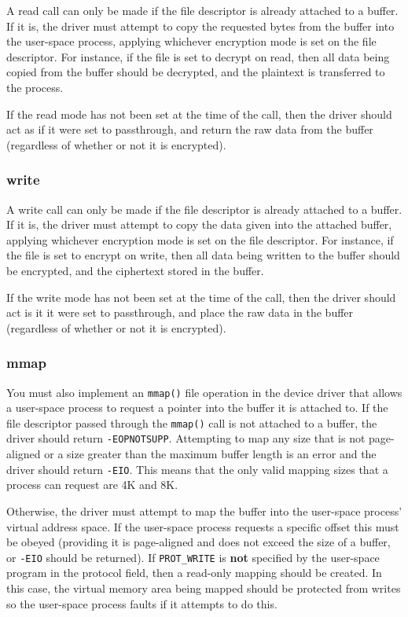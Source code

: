 \documentclass[12pt,a4paper]{article}
\begin{document}
A read call can only be made if the file descriptor is already attached to a
buffer. If it is, the driver must attempt to copy the requested bytes from the
buffer into the user-space process, applying whichever encryption mode is set
on the file descriptor. For instance, if the file is set to decrypt on read,
then all data being copied from the buffer should be decrypted, and the
plaintext is transferred to the process.

If the read mode has not been set at the time of the call, then the driver
should act as if it were set to passthrough, and return the raw data from the
buffer (regardless of whether or not it is encrypted).

\subsubsection*{write}

A write call can only be made if the file descriptor is already attached to a
buffer. If it is, the driver must attempt to copy the data given into the
attached buffer, applying whichever encryption mode is set on the file
descriptor. For instance, if the file is set to encrypt on write, then all data
being written to the buffer should be encrypted, and the ciphertext stored in the
buffer.

If the write mode has not been set at the time of the call, then the driver
should act is it it were set to passthrough, and place the raw data in the
buffer (regardless of whether or not it is encrypted).

\subsubsection*{mmap}

You must also implement an \texttt{mmap()} file operation in the device driver that
allows a user-space process to request a pointer into the buffer it is attached
to. If the file descriptor passed through the \texttt{mmap()} call is not
attached to a buffer, the driver should return \texttt{-EOPNOTSUPP}. Attempting to
map any size that is not page-aligned or a size greater than the maximum buffer
length is an error and the driver should return \texttt{-EIO}. This means that
the only valid mapping sizes that a process can request are 4K and 8K.

Otherwise, the driver must attempt to map the buffer into the user-space
process' virtual address space. If the user-space process requests a specific
offset this must be obeyed (providing it is page-aligned and does not exceed
the size of a buffer, or \texttt{-EIO} should be returned). If
\texttt{PROT\_WRITE} is \textbf{not} specified by the user-space program in the
protocol field, then a read-only mapping should be created. In this case, the
virtual memory area being mapped should be protected from writes so the
user-space process faults if it attempts to do this.
\end{document}
